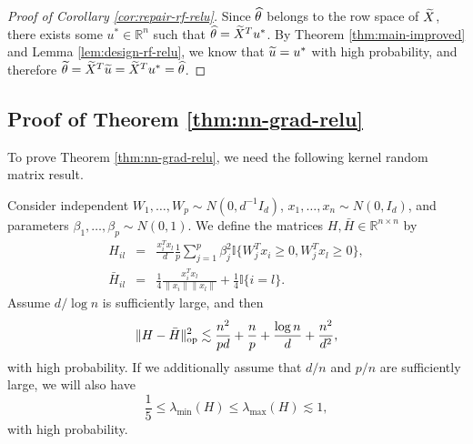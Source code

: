 \begin{proof}[Proof of Corollary \ref{cor:repair-rf-relu}]
Since $\widehat{\theta}$ belongs to the row space of $\widetilde{X}$, there exists some $u^*\in\mathbb{R}^n$ such that $\widehat{\theta}=\widetilde{X}^Tu^*$.
By Theorem \ref{thm:main-improved} and Lemma \ref{lem:design-rf-relu}, we know that $\widetilde{u}=u^*$ with high probability, and therefore $\widetilde{\theta}=\widetilde{X}^T\widetilde{u}=\widetilde{X}^Tu^*=\widehat{\theta}$.
\end{proof}





\subsection{Proof of Theorem \ref{thm:nn-grad-relu}}


To prove Theorem \ref{thm:nn-grad-relu}, we need the following kernel random matrix result.
\begin{lemma}\label{lem:lim-H-relu}
Consider independent $W_1,\ldots,W_p\sim N(0,d^{-1}I_d)$, $x_1,\ldots,x_n\sim N(0,I_d)$, and parameters $\beta_1,\ldots,\beta_p\sim N(0,1)$. We define the matrices $H, \bar{H}\in\mathbb{R}^{n\times n}$ by
\begin{eqnarray*}
H_{il} &=& \frac{x_i^Tx_l}{d}\frac{1}{p}\sum_{j=1}^p\beta_j^2\mathbb{I}\{W_j^Tx_i\geq 0, W_j^Tx_l\geq 0\}, \\
\bar{H}_{il} &=& \frac{1}{4}\frac{x_i^Tx_l}{\|x_i\|\|x_l\|} + \frac{1}{4}\mathbb{I}\{i=l\}.
\end{eqnarray*}
Assume $d/\log n$ is sufficiently large, and then
$$\|H-\bar{H}\|_{\rm op}^2 \lesssim \frac{n^2}{pd} + \frac{n}{p} + \frac{\log n}{d} + \frac{n^2}{d^2},$$
with high probability. If we additionally assume that $d/n$ and $p/n$ are sufficiently large, we will also have
\begin{equation}
\frac{1}{5}\leq\lambda_{\min}(H)\leq\lambda_{\max}(H)\lesssim 1,\label{eq:last-added-ref}
\end{equation}
with high probability.
\end{lemma}
